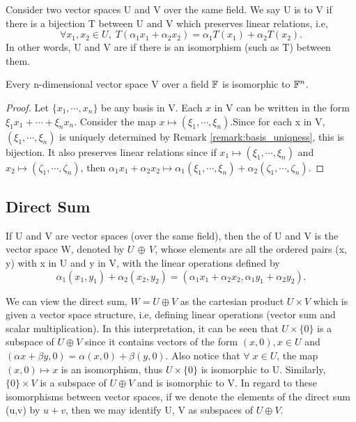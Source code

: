 \documentclass[11pt,a4paper]{article}
\begin{document}
\begin{mydef}\label{def:isomorphism}
    Consider two vector spaces U and V over the same field. We say U is  to V if there is a bijection T between U and V which preserves linear relations, i.e, 
    $$\forall x_1,x_2\in U,\;T(\alpha_1 x_1+\alpha_2 x_2) = \alpha_1 T(x_1)+\alpha_2 T(x_2).
    $$
    In other words, U and V are  if there is an isomorphism (such as T) between them.
\end{mydef}

\begin{theorem}\label{thm:F^n_isomorphism}
    Every n-dimensional vector space V over a field $\mathbb{F}$ is isomorphic to $\mathbb{F}^n$.
\end{theorem}

\begin{proof}
    Let $\{x_1,\cdots, x_n\}$ be any basis in V. Each $x$ in V can be written in the form $\xi_1x_1 + \cdots + \xi_nx_n$. Consider the map $x \mapsto (\xi_1,\cdots,\xi_n)$.Since for each x in V, $(\xi_1,\cdots,\xi_n)$ is uniquely determined by Remark \ref{remark:basis_uniqness}, this is bijection. It also preserves linear relations since if $x_1\mapsto (\xi_1,\cdots,\xi_n)$ and $x_2\mapsto (\zeta_1,\cdots,\zeta_n)$, then
    $
        \alpha_1 x_1+\alpha_2 x_2 \mapsto \alpha_1(\xi_1,\cdots,\xi_n)+\alpha_2(\zeta_1,\cdots,\zeta_n).
    $
\end{proof}


\subsection{Direct Sum}\label{sec:direct_sum}

\begin{mydef}\label{def:direct_sum}
    If U and V are vector spaces (over the same field), then the  of U and V is the vector space W, denoted by $U\,\oplus\, V$, whose elements are all the ordered pairs (x, y) with x in U and y in V, with the linear operations defined by
    $$
    \alpha_1(x_1, y_1) + \alpha_2(x_2, y_2) = (\alpha_1x_1+\alpha_2x_2,\alpha_1y_1+\alpha_2y_2).
    $$
\end{mydef}

\begin{note}\label{note:direct_sum}
    We can view the direct sum, $W = U\oplus V$ as the cartesian product $U\times V$ which is given a vector space structure, i.e, defining linear operations (vector sum and scalar multiplication). In this interpretation, it can be seen that $U\times\{0\}$ is a subspace of $U\oplus V$ since it contains vectors of the form $(x,0),x\in U$ and $(\alpha x+\beta y,0) = \alpha(x,0)+\beta(y,0).$ Also notice that $\forall\;x\in U$, the map $(x,0)\mapsto x$ is an isomorphism, thus $U\times\{0\}$ is isomorphic to U. Similarly, $\{0\}\times V$ is a subspace of $U\oplus V$ and is isomorphic to V. In regard to these isomorphisms between vector spaces, if we denote the elements of the direct sum (u,v) by $u+v$, then we may identify U, V as subspaces of $U\oplus V$.
\end{note}
\end{document}
